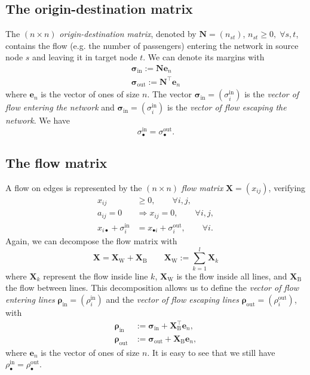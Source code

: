 \documentclass[11p]{article}
\begin{document}
\subsection{The origin-destination matrix}

The $(n \times n)$ \emph{origin-destination matrix}, denoted by $\mathbf{N} = (n_{st})$, $n_{st} \geq 0, \; \forall s,t$, contains the flow (e.g. the number of passengers) entering the network in source node $s$ and leaving it in target node $t$. We can denote its margins with 
\begin{align}
\bm{\sigma}_\text{in} := \mathbf{N} \mathbf{e}_n \\
\bm{\sigma}_\text{out} := \mathbf{N}^\top \mathbf{e}_n
\end{align}
where $\mathbf{e}_n$ is the vector of ones of size $n$. The vector $\bm{\sigma}_\text{in} = (\sigma^\text{in}_i)$ is the \emph{vector of flow entering the network} and $\bm{\sigma}_\text{in} = (\sigma^\text{in}_i)$ is the \emph{vector of flow escaping the network}. We have
\begin{equation}
\sigma^\text{in}_{\bullet} = \sigma^\text{out}_{\bullet}.
\end{equation}

\subsection{The flow matrix}

A flow on edges is represented by the $(n \times n)$ \emph{flow matrix} $\mathbf{X} = (x_{ij})$, verifying
\begin{align}
x_{ij} &\geq 0, \qquad \forall i,j, \\
a_{ij} = 0 &\Rightarrow x_{ij} = 0, \qquad \forall i,j, \\ 
x_{i\bullet} + \sigma^\text{in}_i &= x_{\bullet i} + \sigma^\text{out}_i, \qquad \forall i.
\end{align}
Again, we can decompose the flow matrix with 
\begin{equation}
\mathbf{X} = \mathbf{X}_\text{W} + \mathbf{X}_\text{B} \qquad \mathbf{X}_\text{W} := \sum_{k=1}^l \mathbf{X}_k
\end{equation}
where $\mathbf{X}_k$ represent the flow inside line $k$, $\mathbf{X}_\text{W}$ is the flow inside all lines, and $\mathbf{X}_\text{B}$ the flow between lines. This decomposition allows us to define 
the \emph{vector of flow entering lines} $\bm{\rho}_\text{in} = (\rho^\text{in}_i)$ and the \emph{vector of flow escaping lines} $\bm{\rho}_\text{out} = (\rho^\text{out}_i)$, with
\begin{align}
\bm{\rho}_\text{in} &:= \bm{\sigma}_\text{in} + \mathbf{X}^\top_\text{B} \mathbf{e}_n, \\
\bm{\rho}_\text{out} &:= \bm{\sigma}_\text{out} + \mathbf{X}_\text{B} \mathbf{e}_n,
\end{align}
where $\mathbf{e}_n$ is the vector of ones of size $n$. It is easy to see that we still have $\rho^\text{in}_\bullet = \rho^\text{out}_\bullet$. \\
\end{document}
